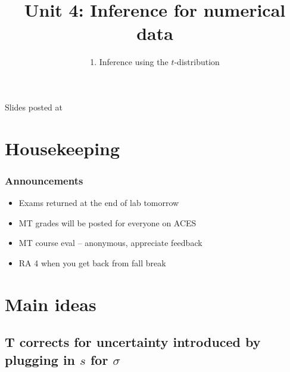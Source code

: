 \documentclass[slidestop,compress,mathserif,12pt,t,professionalfonts,xcolor=table]{beamer}
\title{Unit 4: Inference for numerical data}
\subtitle{1. Inference using the $t$-distribution}
\author{\CourseName}
\date{}
\institute{\InstituteName}
\begin{document}



\begin{frame}[plain]

\titlepage

\vfill

{\scriptsize {} \hfill Slides posted at  \webURL{\CourseSite}}

\addtocounter{framenumber}{-1} 

\end{frame}


\section{Housekeeping}


\begin{frame}
\frametitle{Announcements}

\begin{itemize}

\item Exams returned at the end of lab tomorrow

\item MT grades will be posted for everyone on ACES

\item MT course eval -- anonymous, appreciate feedback

\item RA 4 when you get back from fall break

\end{itemize}

\end{frame}


\section{Main ideas}


\subsection{T corrects for uncertainty introduced by plugging in $s$ for $\sigma$}
\label{mi1}
\end{document}
